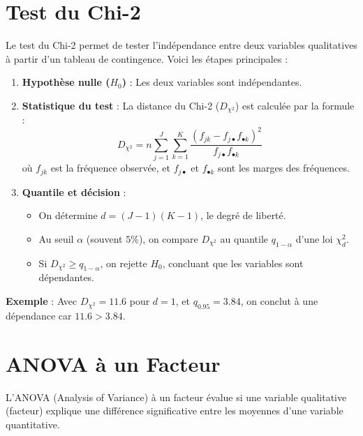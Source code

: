 \documentclass{article}
\begin{document}
\section*{ Test du Chi-2}

Le test du Chi-2 permet de tester l’indépendance entre deux variables qualitatives à partir d’un tableau de contingence. Voici les étapes principales :

\begin{enumerate}
    \item \textbf{Hypothèse nulle (\(H_0\))} : Les deux variables sont indépendantes.
    \item \textbf{Statistique du test} : La distance du Chi-2 (\(D_{\chi^2}\)) est calculée par la formule :
    \[
    D_{\chi^2} = n \sum_{j=1}^J \sum_{k=1}^K \frac{(f_{jk} - f_{j\bullet}f_{\bullet k})^2}{f_{j\bullet}f_{\bullet k}}
    \]
    où \(f_{jk}\) est la fréquence observée, et \(f_{j\bullet}\) et \(f_{\bullet k}\) sont les marges des fréquences.
    \item \textbf{Quantile et décision} :
    \begin{itemize}
        \item On détermine \(d = (J-1)(K-1)\), le degré de liberté.
        \item Au seuil \(\alpha\) (souvent \(5\%\)), on compare \(D_{\chi^2}\) au quantile \(q_{1-\alpha}\) d’une loi \(\chi^2_d\).
        \item Si \(D_{\chi^2} \geq q_{1-\alpha}\), on rejette \(H_0\), concluant que les variables sont dépendantes.
    \end{itemize}
\end{enumerate}

\textbf{Exemple} : Avec \(D_{\chi^2} = 11.6\) pour \(d = 1\), et \(q_{0.95} = 3.84\), on conclut à une dépendance car \(11.6 > 3.84\).

\section*{ ANOVA à un Facteur}

L’ANOVA (Analysis of Variance) à un facteur évalue si une variable qualitative (facteur) explique une différence significative entre les moyennes d’une variable quantitative.
\end{document}
